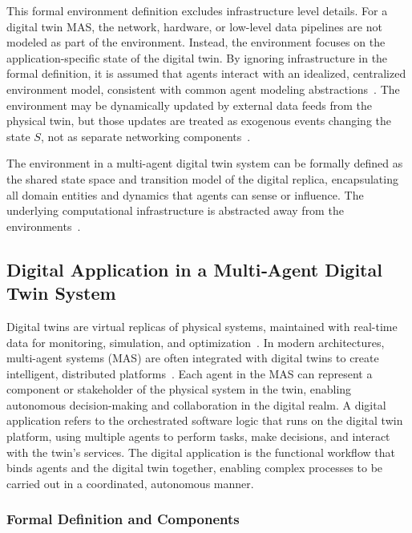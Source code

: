 This formal environment definition excludes infrastructure level details. For a digital twin MAS, the network, hardware, or low-level data pipelines are not modeled as part of the environment. Instead, the environment focuses on the application-specific state of the digital twin. By ignoring infrastructure in the formal definition, it is assumed that agents interact with an idealized, centralized environment model, consistent with common agent modeling abstractions~\cite{weyns2007environment}. The environment may be dynamically updated by external data feeds from the physical twin, but those updates are treated as exogenous events changing the state $S$, not as separate networking components~\cite{Lee2025DigitalTwins, Pretel2024SLR}.

The environment in a multi-agent digital twin system can be formally defined as the shared state space and transition model of the digital replica, encapsulating all domain entities and dynamics that agents can sense or influence. The underlying computational infrastructure is abstracted away from the environments~\cite{weyns2007environment}.


\subsection{Digital Application in a Multi‑Agent Digital Twin System}

Digital twins are virtual replicas of physical systems, maintained with real-time data for monitoring, simulation, and optimization~\cite{Lee2025DigitalTwins}. In modern architectures, multi-agent systems (MAS) are often integrated with digital twins to create intelligent, distributed platforms~\cite{Xu2025Logistics}. Each agent in the MAS can represent a component or stakeholder of the physical system in the twin, enabling autonomous decision-making and collaboration in the digital realm. A digital application refers to the orchestrated software logic that runs on the digital twin platform, using multiple agents to perform tasks, make decisions, and interact with the twin’s services. The digital application is the functional workflow that binds agents and the digital twin together, enabling complex processes to be carried out in a coordinated, autonomous manner.

\subsubsection{Formal Definition and Components}


